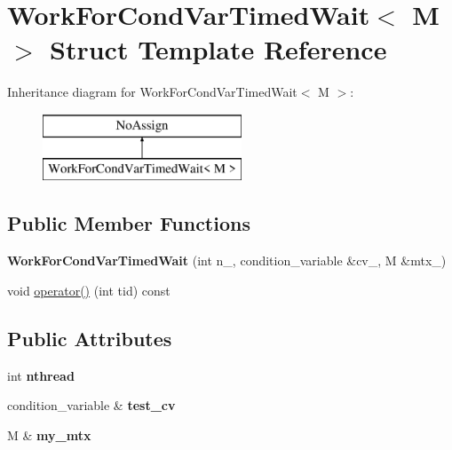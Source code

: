 \hypertarget{structWorkForCondVarTimedWait}{}\section{Work\+For\+Cond\+Var\+Timed\+Wait$<$ M $>$ Struct Template Reference}
\label{structWorkForCondVarTimedWait}
Inheritance diagram for Work\+For\+Cond\+Var\+Timed\+Wait$<$ M $>$\+:\begin{figure}[H]
\begin{center}
\leavevmode
\includegraphics[height=2.000000cm]{structWorkForCondVarTimedWait}
\end{center}
\end{figure}
\subsection*{Public Member Functions}
\begin{DoxyCompactItemize}
\item 
\hypertarget{structWorkForCondVarTimedWait_a58384f3abeea7990e8efc5b86c7edb56}{}{\bfseries Work\+For\+Cond\+Var\+Timed\+Wait} (int n\+\_\+, condition\+\_\+variable \&cv\+\_\+, M \&mtx\+\_\+)\label{structWorkForCondVarTimedWait_a58384f3abeea7990e8efc5b86c7edb56}

\item 
void \hyperlink{structWorkForCondVarTimedWait_a3a8996af8ded061f03c7ae4c77615e6f}{operator()} (int tid) const 
\end{DoxyCompactItemize}
\subsection*{Public Attributes}
\begin{DoxyCompactItemize}
\item 
\hypertarget{structWorkForCondVarTimedWait_a5d850c59cee3bbc32b970c51ab380b84}{}int {\bfseries nthread}\label{structWorkForCondVarTimedWait_a5d850c59cee3bbc32b970c51ab380b84}

\item 
\hypertarget{structWorkForCondVarTimedWait_ad0c6110b68158afaaace4ee33fa40b77}{}condition\+\_\+variable \& {\bfseries test\+\_\+cv}\label{structWorkForCondVarTimedWait_ad0c6110b68158afaaace4ee33fa40b77}

\item 
\hypertarget{structWorkForCondVarTimedWait_a015e3f2a4d24dd4e69e85df8b1964d0a}{}M \& {\bfseries my\+\_\+mtx}\label{structWorkForCondVarTimedWait_a015e3f2a4d24dd4e69e85df8b1964d0a}

\end{DoxyCompactItemize}


